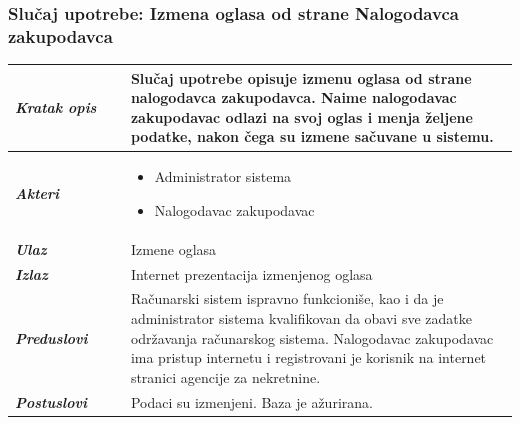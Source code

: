 \documentclass[20pt]{article}
\begin{document}
\subsubsection{\bfseries \large Slu\v{c}aj upotrebe: Izmena oglasa od strane Nalogodavca zakupodavca}
\begin{center}
\begin{longtable}{p{0.23\linewidth} p{0.77\linewidth}}
\hline
 {\it \bfseries Kratak opis} & Slu\v {c}aj upotrebe opisuje izmenu oglasa od strane nalogodavca zakupodavca. Naime nalogodavac zakupodavac odlazi na svoj oglas i menja \v {z}eljene podatke, nakon \v {c}ega su izmene sa\v {c}uvane u sistemu.\\ 
 \hline
 {\it \bfseries Akteri} & \begin{itemize}
    \item Administrator sistema
    \item Nalogodavac zakupodavac
\end{itemize}\\
\hline

 {\it \bfseries Ulaz} & Izmene oglasa\\
 \hline
 
 {\it \bfseries Izlaz} & Internet prezentacija izmenjenog oglasa\\
 \hline
 
 {\it \bfseries Preduslovi} & Ra\v {c}unarski sistem ispravno funkcioni\v {s}e, kao i da je administrator sistema kvalifikovan da obavi sve zadatke odr\v {z}avanja ra\v {c}unarskog sistema. Nalogodavac zakupodavac ima pristup internetu i registrovani je korisnik na internet stranici agencije za nekretnine.\\
 \hline
 
 {\it \bfseries Postuslovi} & Podaci su izmenjeni. Baza je a\v {z}urirana.\\
 \hline


\end{longtable}
\end{center}
\end{document}

